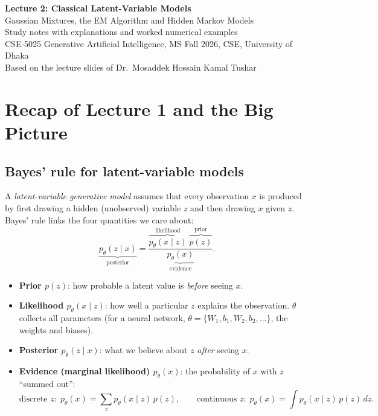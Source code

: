 \documentclass[11pt,a4paper]{article}
\begin{document}
\begin{center}
{\LARGE\bfseries Lecture 2: Classical Latent-Variable Models}\\[4pt]
{\large Gaussian Mixtures, the EM Algorithm and Hidden Markov Models}\\[6pt]
Study notes with explanations and worked numerical examples\\
CSE-5025 Generative Artificial Intelligence, MS Fall 2026, CSE, University of Dhaka\\
Based on the lecture slides of Dr.\ Mosaddek Hossain Kamal Tushar
\end{center}

\tableofcontents
\newpage

\section{Recap of Lecture 1 and the Big Picture}

\subsection{Bayes' rule for latent-variable models}

A \emph{latent-variable generative model} assumes that every observation $x$ is produced by first drawing a hidden (unobserved) variable $z$ and then drawing $x$ given $z$. Bayes' rule links the four quantities we care about:
\[
\underbrace{p_\theta(z\mid x)}_{\text{posterior}}
=\frac{\overbrace{p_\theta(x\mid z)}^{\text{likelihood}}\;\overbrace{p(z)}^{\text{prior}}}{\underbrace{p_\theta(x)}_{\text{evidence}}}.
\]

\begin{itemize}[leftmargin=*]
\item \textbf{Prior $p(z)$}: how probable a latent value is \emph{before} seeing $x$.
\item \textbf{Likelihood $p_\theta(x\mid z)$}: how well a particular $z$ explains the observation. $\theta$ collects all parameters (for a neural network, $\theta=\{W_1,b_1,W_2,b_2,\dots\}$, the weights and biases).
\item \textbf{Posterior $p_\theta(z\mid x)$}: what we believe about $z$ \emph{after} seeing $x$.
\item \textbf{Evidence (marginal likelihood) $p_\theta(x)$}: the probability of $x$ with $z$ ``summed out'':
\[
\text{discrete } z:\; p_\theta(x)=\sum_z p_\theta(x\mid z)\,p(z),
\qquad
\text{continuous } z:\; p_\theta(x)=\int p_\theta(x\mid z)\,p(z)\,dz .
\]
\end{itemize}
\end{document}
